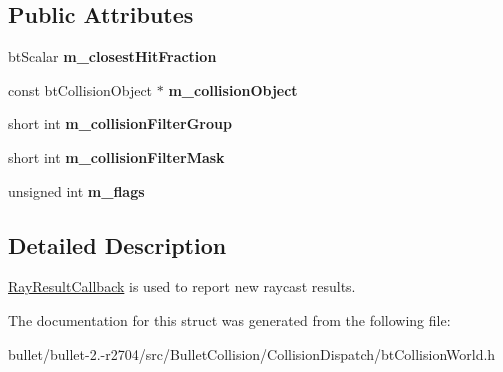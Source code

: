 \subsection*{Public Attributes}
\begin{DoxyCompactItemize}
\item 
\hypertarget{structbt_collision_world_1_1_ray_result_callback_a2218c203bbea335f75f89e8306490af0}{bt\+Scalar {\bfseries m\+\_\+closest\+Hit\+Fraction}}\label{structbt_collision_world_1_1_ray_result_callback_a2218c203bbea335f75f89e8306490af0}

\item 
\hypertarget{structbt_collision_world_1_1_ray_result_callback_adc357c2cd9f5d9cc06948b7c1b1a985c}{const bt\+Collision\+Object $\ast$ {\bfseries m\+\_\+collision\+Object}}\label{structbt_collision_world_1_1_ray_result_callback_adc357c2cd9f5d9cc06948b7c1b1a985c}

\item 
\hypertarget{structbt_collision_world_1_1_ray_result_callback_ade19984f0d4cdaf9b0e53062d8c5552d}{short int {\bfseries m\+\_\+collision\+Filter\+Group}}\label{structbt_collision_world_1_1_ray_result_callback_ade19984f0d4cdaf9b0e53062d8c5552d}

\item 
\hypertarget{structbt_collision_world_1_1_ray_result_callback_ab958e40e9ae9cb76659b1f357a8e2a41}{short int {\bfseries m\+\_\+collision\+Filter\+Mask}}\label{structbt_collision_world_1_1_ray_result_callback_ab958e40e9ae9cb76659b1f357a8e2a41}

\item 
\hypertarget{structbt_collision_world_1_1_ray_result_callback_ae2e70d1f7f07be17924a0f8f5b28f2c5}{unsigned int {\bfseries m\+\_\+flags}}\label{structbt_collision_world_1_1_ray_result_callback_ae2e70d1f7f07be17924a0f8f5b28f2c5}

\end{DoxyCompactItemize}


\subsection{Detailed Description}
\hyperlink{structbt_collision_world_1_1_ray_result_callback}{Ray\+Result\+Callback} is used to report new raycast results. 

The documentation for this struct was generated from the following file\+:\begin{DoxyCompactItemize}
\item 
bullet/bullet-\/2.-\/r2704/src/\+Bullet\+Collision/\+Collision\+Dispatch/bt\+Collision\+World.\+h\end{DoxyCompactItemize}
